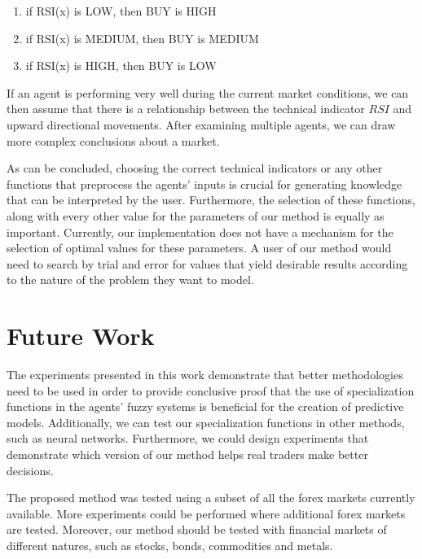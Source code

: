 \documentclass{ieeeaccess}
\begin{document}
\begin{enumerate}
	\item if RSI(x) is LOW, then BUY is HIGH
	\item if RSI(x) is MEDIUM, then BUY is MEDIUM
	\item if RSI(x) is HIGH, then BUY is LOW
\end{enumerate}

If an agent is performing very well during the current market
conditions, we can then assume that there is a relationship between
the technical indicator $RSI$ and upward directional movements. After
examining multiple agents, we can draw more complex conclusions about
a market.



As can be concluded, choosing the correct technical indicators or any
other functions that preprocess the agents' inputs is crucial for
generating knowledge that can be interpreted by the user. Furthermore,
the selection of these functions, along with every other value for the
parameters of our method is equally as important. Currently, our
implementation does not have a mechanism for the selection of optimal
values for these parameters. A user of our method would need to search
by trial and error for values that yield desirable results according
to the nature of the problem they want to model.

\section{Future Work}
\label{section:future-work}

The experiments presented in this work demonstrate that better
methodologies need to be used in order to provide conclusive proof
that the use of specialization functions in the agents' fuzzy systems is
beneficial for the creation of predictive models. Additionally, we can
test our specialization functions in other methods, such as neural
networks. Furthermore, we could design experiments that demonstrate
which version of our method helps real traders make better decisions.

The proposed method was tested using a subset of all the forex markets
currently available. More experiments could be performed where
additional forex markets are tested. Moreover, our method should be
tested with financial markets of different natures, such as stocks,
bonds, commodities and metals.
\end{document}
